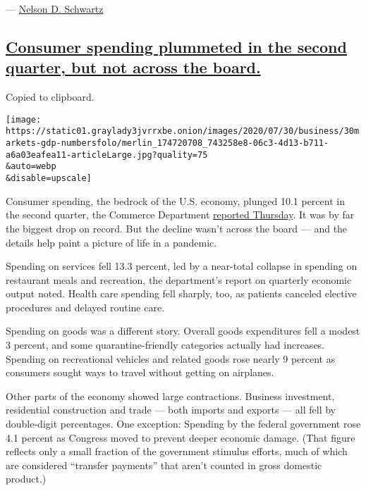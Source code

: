 ---
\href{https://www.nytimes3xbfgragh.onion/by/nelson-d-schwartz}{Nelson D.
Schwartz}

\hypertarget{consumer-spending-plummeted-in-the-second-quarter-but-not-across-the-board}{%
\subsection{\texorpdfstring{\protect\hyperlink{consumer-spending-plummeted-in-the-second-quarter-but-not-across-the-board}{Consumer
spending plummeted in the second quarter, but not across the
board.}}{Consumer spending plummeted in the second quarter, but not across the board.}}\label{consumer-spending-plummeted-in-the-second-quarter-but-not-across-the-board}}

Copied to clipboard.

\texttt{[image: https://static01.graylady3jvrrxbe.onion/images/2020/07/30/business/30markets-gdp-numbersfolo/merlin\_174720708\_743258e8-06c3-4d13-b711-a6a03eafea11-articleLarge.jpg?quality=75\\\&auto=webp\\\&disable=upscale]}

Consumer spending, the bedrock of the U.S. economy, plunged 10.1 percent
in the second quarter, the Commerce Department
\href{https://www.bea.gov/sites/default/files/2020-07/gdp2q20_adv.pdf}{reported
Thursday}. It was by far the biggest drop on record. But the decline
wasn't across the board --- and the details help paint a picture of life
in a pandemic.

Spending on services fell 13.3 percent, led by a near-total collapse in
spending on restaurant meals and recreation, the department's report on
quarterly economic output noted. Health care spending fell sharply, too,
as patients canceled elective procedures and delayed routine care.

Spending on goods was a different story. Overall goods expenditures fell
a modest 3 percent, and some quarantine-friendly categories actually had
increases. Spending on recreational vehicles and related goods rose
nearly 9 percent as consumers sought ways to travel without getting on
airplanes.

Other parts of the economy showed large contractions. Business
investment, residential construction and trade --- both imports and
exports --- all fell by double-digit percentages. One exception:
Spending by the federal government rose 4.1 percent as Congress moved to
prevent deeper economic damage. (That figure reflects only a small
fraction of the government stimulus efforts, much of which are
considered ``transfer payments'' that aren't counted in gross domestic
product.)

